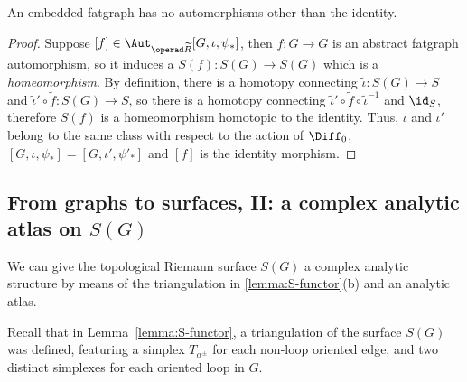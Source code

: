 \begin{lemma}
  \label{lemma:erg-no-aut}
  An embedded fatgraph has no automorphisms other than the identity.
\end{lemma}
\begin{proof}
  Suppose $[f] \in \Aut_{\ERG}[G, \iota, \psi_*]$, then $f:G\to G$ is an abstract
  fatgraph automorphism, so it induces a $S(f): S(G) \to S(G)$
  which is a \emph{homeomorphism}.  By definition, there is a homotopy
  connecting ${\tilde \iota}: S(G) \to S$ and ${\tilde \iota'} \circ {\tilde f}:
  S(G)\to S$, so there is a homotopy connecting ${\tilde \iota'} \circ {\tilde f}
  \circ {\tilde \iota}^{-1}$ and $\id_S$, therefore $S(f)$ is a
  homeomorphism homotopic to the identity.  Thus, $\iota$ and $\iota'$ belong
  to the same class with respect to the action of $\Diff_0$, $[G, \iota,
  \psi_*] = [G, \iota', \psi'_*]$ and $[f]$ is the identity morphism.
\end{proof}


\subsection[From graphs to surfaces, II][A complex analytic atlas on $S(G)$]
{From graphs to surfaces, II: a complex analytic atlas on $S(G)$}
\label{sec:atlas}

We can give the topological Riemann surface $S(G)$ a complex analytic
structure by means of the triangulation in \ref{lemma:S-functor}(b)
and an analytic atlas.

Recall that in Lemma~\ref{lemma:S-functor}, a triangulation of the surface
$S(G)$ was defined, featuring a simplex $T_{\alpha^\pm}$ for each
non-loop oriented edge, and two distinct simplexes for each oriented
loop in $G$.

